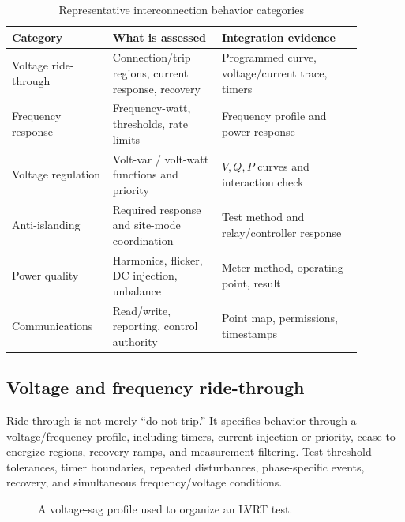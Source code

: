 \documentclass[11pt]{article}
\begin{document}
\begin{table}[h]
\centering
\caption{Representative interconnection behavior categories}
\begin{tabular}{p{0.23\linewidth}p{0.29\linewidth}p{0.36\linewidth}}
\toprule
Category & What is assessed & Integration evidence \\
\midrule
Voltage ride-through & Connection/trip regions, current response, recovery & Programmed curve, voltage/current trace, timers \\
Frequency response & Frequency-watt, thresholds, rate limits & Frequency profile and power response \\
Voltage regulation & Volt-var / volt-watt functions and priority & $V,Q,P$ curves and interaction check \\
Anti-islanding & Required response and site-mode coordination & Test method and relay/controller response \\
Power quality & Harmonics, flicker, DC injection, unbalance & Meter method, operating point, result \\
Communications & Read/write, reporting, control authority & Point map, permissions, timestamps \\
\bottomrule
\end{tabular}
\end{table}

\subsection{Voltage and frequency ride-through}
Ride-through is not merely ``do not trip.'' It specifies behavior through a
voltage/frequency profile, including timers, current injection or priority,
cease-to-energize regions, recovery ramps, and measurement filtering. Test
threshold tolerances, timer boundaries, repeated disturbances, phase-specific
events, recovery, and simultaneous frequency/voltage conditions.

\begin{figure}[h]
\centering
{}
\caption{A voltage-sag profile used to organize an LVRT test.}
\end{figure}
\end{document}

